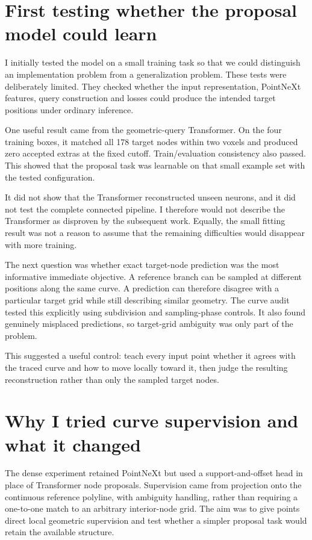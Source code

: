 \documentclass[11pt,a4paper]{article}
\newcommand{\evidence}[1]{~\cite{#1}}
\begin{document}
\section{First testing whether the proposal model could learn}
I initially tested the model on a small training task so that we could distinguish an implementation problem from a generalization problem. These tests were deliberately limited. They checked whether the input representation, PointNeXt features, query construction and losses could produce the intended target positions under ordinary inference.

One useful result came from the geometric-query Transformer. On the four training boxes, it matched all 178 target nodes within two voxels and produced zero accepted extras at the fixed cutoff. Train/evaluation consistency also passed. This showed that the proposal task was learnable on that small example set with the tested configuration.\evidence{transformer}

It did not show that the Transformer reconstructed unseen neurons, and it did not test the complete connected pipeline. I therefore would not describe the Transformer as disproven by the subsequent work. Equally, the small fitting result was not a reason to assume that the remaining difficulties would disappear with more training.

The next question was whether exact target-node prediction was the most informative immediate objective. A reference branch can be sampled at different positions along the same curve. A prediction can therefore disagree with a particular target grid while still describing similar geometry. The curve audit tested this explicitly using subdivision and sampling-phase controls. It also found genuinely misplaced predictions, so target-grid ambiguity was only part of the problem.\evidence{formulation}

This suggested a useful control: teach every input point whether it agrees with the traced curve and how to move locally toward it, then judge the resulting reconstruction rather than only the sampled target nodes.

\section{Why I tried curve supervision and what it changed}
The dense experiment retained PointNeXt but used a support-and-offset head in place of Transformer node proposals. Supervision came from projection onto the continuous reference polyline, with ambiguity handling, rather than requiring a one-to-one match to an arbitrary interior-node grid. The aim was to give points direct local geometric supervision and test whether a simpler proposal task would retain the available structure.\evidence{broad}
\end{document}
